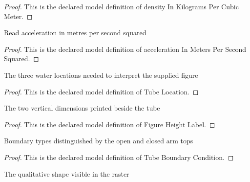 \begin{proof}
  This is the declared model definition of density In Kilograms Per Cubic Meter.
\end{proof}
\begin{definition}
  \label{def:physics:phyx-mini-0721:phyxminiproblems-problemphyxmini0721-accelerationinmeterspersecondsquared}
  Read acceleration in metres per second squared
\end{definition}
\begin{proof}
  This is the declared model definition of acceleration In Meters Per Second Squared.
\end{proof}
\begin{definition}
  \label{def:physics:phyx-mini-0721:phyxminiproblems-problemphyxmini0721-tubelocation}
  The three water locations needed to interpret the supplied figure
\end{definition}
\begin{proof}
  This is the declared model definition of Tube Location.
\end{proof}
\begin{definition}
  \label{def:physics:phyx-mini-0721:phyxminiproblems-problemphyxmini0721-figureheightlabel}
  The two vertical dimensions printed beside the tube
\end{definition}
\begin{proof}
  This is the declared model definition of Figure Height Label.
\end{proof}
\begin{definition}
  \label{def:physics:phyx-mini-0721:phyxminiproblems-problemphyxmini0721-tubeboundarycondition}
  Boundary types distinguished by the open and closed arm tops
\end{definition}
\begin{proof}
  This is the declared model definition of Tube Boundary Condition.
\end{proof}
\begin{definition}
  \label{def:physics:phyx-mini-0721:phyxminiproblems-problemphyxmini0721-tubeshape}
  The qualitative shape visible in the raster
\end{definition}
